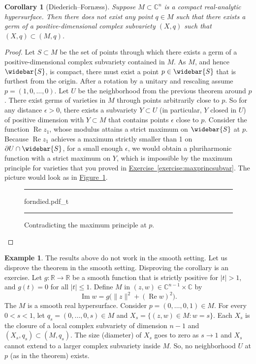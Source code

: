 \documentclass[12pt,openany]{book}
\renewcommand{\Re}{\operatorname{Re}}
\renewcommand{\Im}{\operatorname{Im}}
\newcommand{\sabs}[1]{\lvert {#1} \rvert}
\newcommand{\snorm}[1]{\lVert {#1} \rVert}
\newcommand{\C}{{\mathbb{C}}}
\newcommand{\R}{{\mathbb{R}}}
\theoremstyle{plain}
\newtheorem{cor}[thm]{Corollary}
\theoremstyle{remark}
\theoremstyle{definition}
\newenvironment{myfig}{%
\begin{figure}[h!t]
\noindent\rule{\textwidth}{0.5pt}\vspace{12pt}\par\centering}%
{\par\noindent\rule{\textwidth}{0.5pt}
\end{figure}}
\theoremstyle{exercise}
\theoremstyle{example}
\newtheorem{example}[thm]{Example}
\newcommand{\figureref}[1]{\hyperref[#1]{Figure~\ref*{#1}}}
\newcommand{\exerciseref}[1]{\hyperref[#1]{Exercise~\ref*{#1}}}
\begin{document}
\begin{cor}[Diederich--Forn\ae ss]
Suppose $M \subset \C^n$ is a compact real-analytic hypersurface.
Then there does not exist any point $q \in M$ such that
there exists a germ of a positive-dimensional complex subvariety
$(X,q)$ such that $(X,q) \subset (M,q)$.
\end{cor}

\begin{proof}
Let $S \subset M$ be the set of points through which there exists
a germ of a positive-dimensional complex subvariety contained in $M$.
As $M$, and hence $\widebar{S}$, is compact,
there must exist a point $p \in \widebar{S}$
that is furthest from
the origin.  After a rotation by a unitary and rescaling assume
$p=(1,0,\ldots,0)$.  Let $U$ be the neighborhood from the previous
theorem around $p$.  There exist germs of varieties in $M$ through points
arbitrarily close to $p$.  So for any distance $\epsilon > 0$,
there exists a subvariety $Y \subset U$ (in particular, $Y$ closed in $U$)
of positive dimension with $Y \subset M$ that contains points
$\epsilon$ close to $p$.  Consider the function $\Re z_1$, whose modulus attains a
strict maximum on $\widebar{S}$ at $p$.  Because $\Re z_1$ achieves a maximum
strictly smaller than 1 on $\partial U \cap \widebar{S}$, for a small enough $\epsilon$,
we would obtain a pluriharmonic function with a strict
maximum on $Y$, which is impossible by the maximum principle for
varieties that you proved in \exerciseref{exercise:maxprincsubvar}.
The picture would look as in \figureref{fig:forndied}.
\begin{myfig}
\medskip
{forndied.pdf_t}
\caption{Contradicting the maximum principle at $p$.\label{fig:forndied}}
\end{myfig}
\end{proof}

\begin{example}
The results above do not work
in the smooth setting.  Let us disprove the theorem in the smooth
setting.  Disproving the corollary is an exercise.
Let $g \colon \R \to \R$ be a smooth function that is
strictly positive for $\sabs{t} > 1$, and $g(t) = 0$ for all $\sabs{t} \leq 1$.
Define $M$ in $(z,w) \in \C^{n-1} \times \C$ by
\begin{equation*}
\Im w = g\bigl(\snorm{z}^2 + (\Re w)^2\bigr) .
\end{equation*}
The $M$ is a smooth real hypersurface.
Consider $p = (0,\ldots,0,1) \in M$.  For every $0 < s < 1$, let
$q_s = (0,\ldots,0,s) \in M$ and $X_s = \bigl\{ (z,w) \in M :
w = s \bigr\}$.  Each $X_s$ is the closure of a local complex subvariety of dimension $n-1$
and $(X_s,q_s) \subset (M,q_s)$.  The size (diameter) of $X_s$ goes to
zero as $s \to 1$ and $X_s$ cannot extend to a
larger complex subvariety inside $M$.  So, no neighborhood $U$ at
$p$ (as in the theorem) exists.
\end{example}
\end{document}
